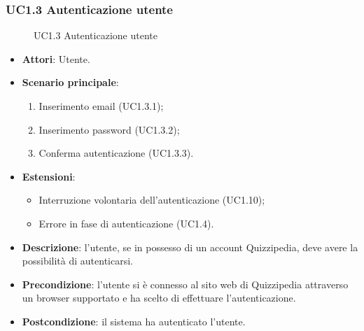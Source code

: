 \subsubsection{UC1.3 Autenticazione utente}
\begin{figure}[H]
\centering
\noindent{}
\caption{UC1.3 Autenticazione utente}
\end{figure}
\begin{itemize}
\item \textbf{Attori}: Utente.
\item \textbf{Scenario principale}:
\begin{enumerate}
\item Inserimento email (UC1.3.1);
\item Inserimento password (UC1.3.2);
\item Conferma autenticazione (UC1.3.3).
\end{enumerate}
\item \textbf{Estensioni}:
\begin{itemize}
\item Interruzione volontaria dell'autenticazione (UC1.10);
\item Errore in fase di autenticazione (UC1.4).
\end{itemize}
\item \textbf{Descrizione}: l'utente, se in possesso di un account Quizzipedia, deve avere la possibilità di autenticarsi.
\item \textbf{Precondizione}: l'utente si è connesso al sito web di Quizzipedia attraverso un browser supportato e ha scelto di effettuare l'autenticazione.
\item \textbf{Postcondizione}: il sistema ha autenticato l'utente.
\end{itemize}

